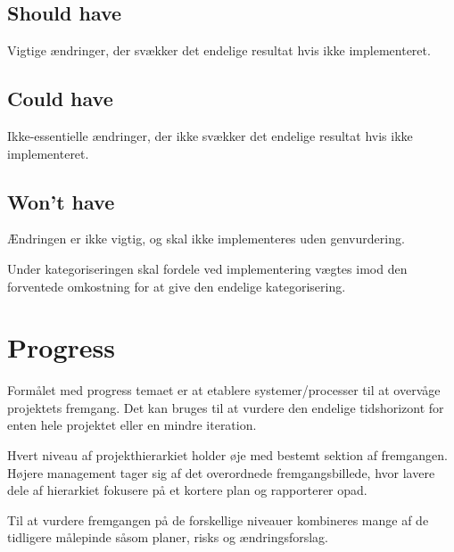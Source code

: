 \subsection*{Should have}
Vigtige ændringer, der svækker det endelige resultat hvis ikke implementeret.

\subsection*{Could have}
Ikke-essentielle ændringer, der ikke svækker det endelige resultat hvis ikke implementeret.

\subsection*{Won't have}
Ændringen er ikke vigtig, og skal ikke implementeres uden genvurdering.

Under kategoriseringen skal fordele ved implementering vægtes imod den forventede omkostning for at give den endelige kategorisering.

\section{Progress}
Formålet med progress temaet er at etablere systemer/processer til at overvåge projektets fremgang. Det kan bruges til at vurdere den endelige tidshorizont for enten hele projektet eller en mindre iteration.

Hvert niveau af projekthierarkiet holder øje med bestemt sektion af fremgangen. Højere management tager sig af det overordnede fremgangsbillede, hvor lavere dele af hierarkiet fokusere på et kortere plan og rapporterer opad.

Til at vurdere fremgangen på de forskellige niveauer kombineres mange af de tidligere målepinde såsom planer, risks og ændringsforslag.
